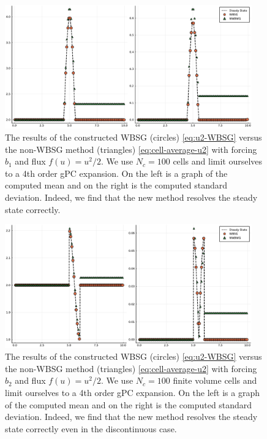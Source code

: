 \documentclass[12pt]{article}
\begin{document}
\begin{figure}[!htb]
    \centering
    \includegraphics[width=0.95\textwidth]{Figures/b1}
    \caption{The results of the constructed WBSG (circles) \eqref{eq:u2-WBSG} versus the non-WBSG method (triangles) \eqref{eq:cell-average-u2} with forcing $b_1$ and flux $f(u) = u^2/2$. We use $N_c = 100$ cells and limit ourselves to a 4th order gPC expansion. On the left is a graph of the computed mean and on the right is the computed standard deviation. Indeed, we find that the new method resolves the steady state correctly.}
    \label{fig:b1}
\end{figure}
\begin{figure}[!htb]
    \centering
    \includegraphics[width=0.95\textwidth]{Figures/b2}
    \caption{The results of the constructed WBSG (circles) \eqref{eq:u2-WBSG} versus the non-WBSG method (triangles) \eqref{eq:cell-average-u2} with forcing $b_2$ and flux $f(u) = u^2/2$. We use $N_c = 100$ finite volume cells and limit ourselves to a 4th order gPC expansion. On the left is a graph of the computed mean and on the right is the computed standard deviation. Indeed, we find that the new method resolves the steady state correctly even in the discontinuous case.}
    \label{fig:b2}
\end{figure}
\end{document}
